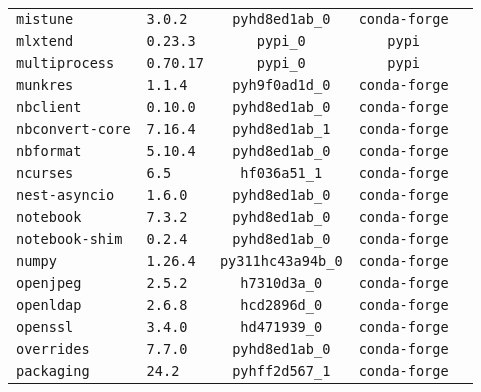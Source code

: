 \begin{longtable}{p{}|l|ccc}
\texttt{mistune}                  & \texttt{3.0.2}              & \texttt{pyhd8ed1ab\_0}     & \texttt{conda-forge}\\
\texttt{mlxtend}                  & \texttt{0.23.3}             & \texttt{pypi\_0}           & \texttt{pypi}\\
\texttt{multiprocess}             & \texttt{0.70.17}            & \texttt{pypi\_0}           & \texttt{pypi}\\
\texttt{munkres}                   & \texttt{1.1.4}              & \texttt{pyh9f0ad1d\_0}    & \texttt{conda-forge}\\
\texttt{nbclient}                  & \texttt{0.10.0}             & \texttt{pyhd8ed1ab\_0}    & \texttt{conda-forge}\\
\texttt{nbconvert-core}            & \texttt{7.16.4}             & \texttt{pyhd8ed1ab\_1}    & \texttt{conda-forge}\\
\texttt{nbformat}                  & \texttt{5.10.4}             & \texttt{pyhd8ed1ab\_0}    & \texttt{conda-forge}\\
\texttt{ncurses}                   & \texttt{6.5}                & \texttt{hf036a51\_1}      & \texttt{conda-forge}\\
\texttt{nest-asyncio}              & \texttt{1.6.0}              & \texttt{pyhd8ed1ab\_0}    & \texttt{conda-forge}\\
\texttt{notebook}                  & \texttt{7.3.2}              & \texttt{pyhd8ed1ab\_0}    & \texttt{conda-forge}\\
\texttt{notebook-shim}             & \texttt{0.2.4}              & \texttt{pyhd8ed1ab\_0}    & \texttt{conda-forge}\\
\texttt{numpy}                     & \texttt{1.26.4}             & \texttt{py311hc43a94b\_0} & \texttt{conda-forge}\\
\texttt{openjpeg}                  & \texttt{2.5.2}              & \texttt{h7310d3a\_0}      & \texttt{conda-forge}\\
\texttt{openldap}                  & \texttt{2.6.8}              & \texttt{hcd2896d\_0}      & \texttt{conda-forge}\\
\texttt{openssl}                   & \texttt{3.4.0}              & \texttt{hd471939\_0}      & \texttt{conda-forge}\\
\texttt{overrides}                 & \texttt{7.7.0}              & \texttt{pyhd8ed1ab\_0}    & \texttt{conda-forge}\\
\texttt{packaging}                 & \texttt{24.2}               & \texttt{pyhff2d567\_1}    & \texttt{conda-forge}\\

\end{longtable}
